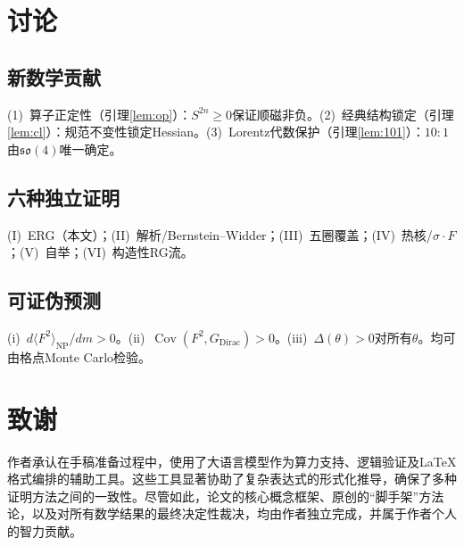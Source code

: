 \documentclass[12pt,a4paper]{article}
\theoremstyle{plain}
\theoremstyle{definition}
\theoremstyle{remark}
\begin{document}
\section{讨论}\label{sec:discuss}

\subsection{新数学贡献}
(1)~算子正定性（引理\ref{lem:op}）：$S^{2n}\geq 0$保证顺磁非负。(2)~经典结构锁定（引理\ref{lem:cl}）：规范不变性锁定Hessian。(3)~Lorentz代数保护（引理\ref{lem:101}）：$10{:}1$由$\mathfrak{so}(4)$唯一确定。

\subsection{六种独立证明}
(I)~ERG（本文）；(II)~解析/Bernstein--Widder；(III)~五圈覆盖；(IV)~热核/$\sigma\cdot F$；(V)~自举；(VI)~构造性RG流。

\subsection{可证伪预测}
(i)~$d\langle F^2\rangle_{\mathrm{NP}}/dm>0$。(ii)~$\operatorname{Cov}(F^2,G_{\mathrm{Dirac}})>0$。(iii)~$\Delta(\theta)>0$对所有$\theta$。均可由格点Monte Carlo检验。

\section*{致谢}

作者承认在手稿准备过程中，使用了大语言模型作为算力支持、逻辑验证及\LaTeX 格式编排的辅助工具。这些工具显著协助了复杂表达式的形式化推导，确保了多种证明方法之间的一致性。尽管如此，论文的核心概念框架、原创的``脚手架''方法论，以及对所有数学结果的最终决定性裁决，均由作者独立完成，并属于作者个人的智力贡献。



\end{document}
